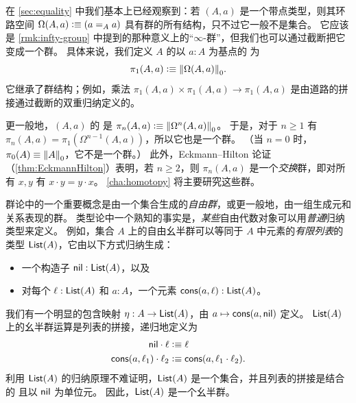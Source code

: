 \begin{eg}\label{thm:homotopy-groups}
  在 \cref{sec:equality} 中我们基本上已经观察到：若 $(A,a)$ 是一个带点类型，则其环路空间 $\Omega(A,a)\defeq (\id[A]aa)$ 具有群的所有结构，只不过它一般不是集合。
  它应该是 \cref{rmk:infty-group} 中提到的那种意义上的“$\infty$-群”，但我们也可以通过截断把它变成一个群。
  具体来说，我们定义 $A$ 的以 $a:A$ 为基点的
  为
  \[\pi_1(A,a)\defeq \trunc0{\Omega(A,a)}.\]
  它继承了群结构；例如，乘法 $\pi_1(A,a) \times \pi_1(A,a) \to \pi_1(A,a)$ 是由道路的拼接通过截断的双重归纳定义的。

  更一般地，$(A,a)$ 的
  是 $\pi_n(A,a)\defeq \trunc0{\Omega^n(A,a)}$。
  于是，对于 $n\ge 1$ 有 $\pi_n(A,a) = \pi_1(\Omega^{n-1}(A,a))$，所以它也是一个群。
  （当 $n=0$ 时，$\pi_0(A) \jdeq \trunc0 A$，它不是一个群。）
  此外，Eckmann--Hilton 论证  （\cref{thm:EckmannHilton}）表明，若 $n\ge 2$，则 $\pi_n(A,a)$ 是一个\emph{交换}群，即对所有 $x,y$ 有 $x\cdot y = y\cdot x$。
  \cref{cha:homotopy} 将主要研究这些群。
\end{eg}

%
%
群论中的一个重要概念是由一个集合生成的\emph{自由群}，或更一般地，由一组生成元和关系表现的群。
类型论中一个熟知的事实是，\emph{某些}自由代数对象可以用\emph{普通}归纳类型来定义。
%
%
%
%
例如，集合 $A$ 上的自由幺半群可以等同于 $A$ 中元素的\emph{有限列表}的类型 $\lst A$，它由以下方式归纳生成：

\begin{itemize}
\item 一个构造子 $\nil:\lst A$，以及
\item 对每个 $\ell:\lst A$ 和 $a:A$，一个元素 $\cons(a,\ell):\lst A$。
\end{itemize}

我们有一个明显的包含映射 $\eta : A\to \lst A$，由 $a\mapsto \cons(a,\nil)$ 定义。
$\lst A$ 上的幺半群运算是列表的拼接，递归地定义为
\begin{align*}
  \nil \cdot \ell &\defeq \ell\\
  \cons (a,\ell_1) \cdot \ell_2 &\defeq \cons(a, \ell_1\cdot\ell_2).
\end{align*}
利用 $\lst A$ 的归纳原理不难证明，$\lst A$ 是一个集合，并且列表的拼接是结合的
%
且以 $\nil$ 为单位元。
因此，$\lst A$ 是一个幺半群。

